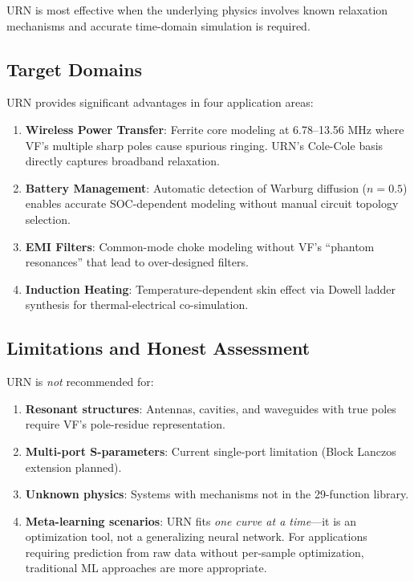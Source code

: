 \documentclass{ieeeaccess}
\begin{document}
URN is most effective when the underlying physics involves known relaxation mechanisms and accurate time-domain simulation is required.

\subsection{Target Domains}

URN provides significant advantages in four application areas:

\begin{enumerate}
\item \textbf{Wireless Power Transfer}: Ferrite core modeling at 6.78--13.56 MHz where VF's multiple sharp poles cause spurious ringing. URN's Cole-Cole basis directly captures broadband relaxation.

\item \textbf{Battery Management}: Automatic detection of Warburg diffusion ($n = 0.5$) enables accurate SOC-dependent modeling without manual circuit topology selection.

\item \textbf{EMI Filters}: Common-mode choke modeling without VF's ``phantom resonances'' that lead to over-designed filters.

\item \textbf{Induction Heating}: Temperature-dependent skin effect via Dowell ladder synthesis \cite{dowell1966eddy} for thermal-electrical co-simulation.
\end{enumerate}

\subsection{Limitations and Honest Assessment}

URN is \textit{not} recommended for:
\begin{enumerate}
\item \textbf{Resonant structures}: Antennas, cavities, and waveguides with true poles require VF's pole-residue representation.
\item \textbf{Multi-port S-parameters}: Current single-port limitation (Block Lanczos extension planned).
\item \textbf{Unknown physics}: Systems with mechanisms not in the 29-function library.
\item \textbf{Meta-learning scenarios}: URN fits \textit{one curve at a time}---it is an optimization tool, not a generalizing neural network. For applications requiring prediction from raw data without per-sample optimization, traditional ML approaches are more appropriate.
\end{enumerate}
\end{document}
